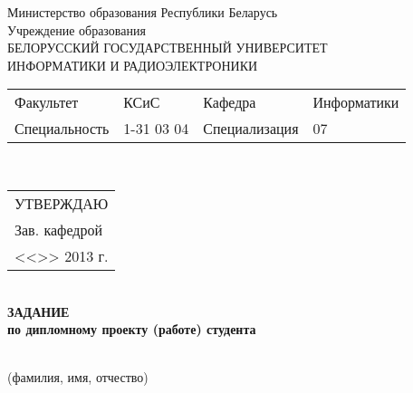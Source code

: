 {
  \thispagestyle{empty}
  \setlength{\parindent}{0em}

  \newcommand{\lineunderscore}{\uline{\hspace*{\fill}}}

  \begin{center}
    Министерство образования Республики Беларусь\\
    Учреждение образования\\
    БЕЛОРУССКИЙ ГОСУДАРСТВЕННЫЙ УНИВЕРСИТЕТ \\
    ИНФОРМАТИКИ И РАДИОЭЛЕКТРОНИКИ\\[1em]
  

  \begin{minipage}{\textwidth}
    \begin{flushleft}
      \begin{tabular}{ p{}p{}p{}p{} @{} }
        Факультет & КСиС & Кафедра & Информатики \\
        Специальность   & 1-31 03 04 & Специализация & 07
      \end{tabular}
    \end{flushleft}
  \end{minipage}\\[1em]

  \begin{minipage}{\textwidth}
    \begin{flushright}
      \begin{tabular}{p{}}
        УТВЕРЖДАЮ \\[0.5em]
        \underline{\hspace*{7em}} Зав. кафедрой \\
        <<\underline{\hspace*{4ex}}>> \underline{\hspace*{7em}} 2013 г.
      \end{tabular}
    \end{flushright}
  \end{minipage}\\[1em]

  \textbf{ЗАДАНИЕ} \\
  \textbf{по дипломному проекту (работе) студента}

  \lineunderscore \\
  {\small (фамилия, имя, отчество) }

  \end{center}

}
